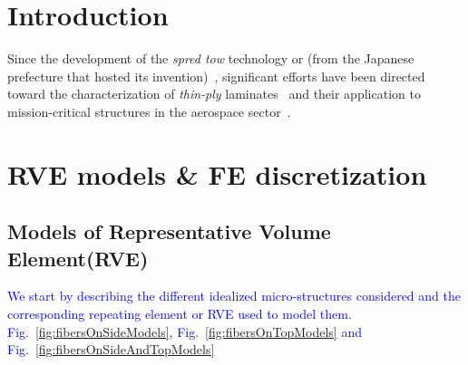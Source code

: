 \documentclass[review]{elsarticle}
\begin{document}
\linenumbers

\section{Introduction}

Since the development of the \emph{spred tow} technology or  (from the Japanese prefecture that hosted its invention)~\cite{Kawabe2008,Kawabe2008en}, significant efforts have been directed toward the characterization of \emph{thin-ply} laminates~\cite{Sasayama2003,Yamaguchi2005,Tsai2005,Sihn2007,Yokozeki2008,Yokozeki2010,Saito2012,Arteiro2013,Arteiro2014,Amacher2014,Guillamet2014,Huang2018,Cugnoni2018} and their application to mission-critical structures in the aerospace sector~\cite{Moon2011,Kim2017,Kopp2017,McCarville2018}.\\


\section{RVE models \& FE discretization}

\subsection{Models of Representative Volume Element(RVE)}

\textcolor{blue}{We start by describing the different idealized micro-structures considered and the corresponding repeating element or RVE used to model them. Fig.~\ref{fig:fibersOnSideModels}, Fig.~\ref{fig:fibersOnTopModels} and Fig.~\ref{fig:fibersOnSideAndTopModels}}
\end{document}
